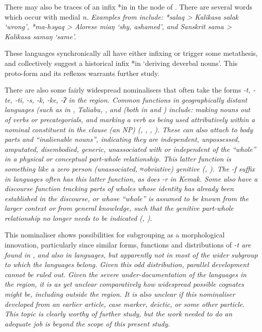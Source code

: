 There may also be traces of an infix *\<in\> in the
 node of .
There are several words which
occur with medial \it{n}.
Examples from \citet{Fricke2019} include:
*salaq > Kalikasa \it{salak} `wrong',
*ma-həyaq > Alorese \it{miaŋ} `shy, ashamed',
and Sanskrit \it{sama} > Kalikasa \it{samaŋ} `same'.

These languages synchronically all have either infixing or trigger
some metathesis, and collectively suggest a historical infix *\<in\> ‘deriving deverbal nouns’.
This proto-form and its reflexes warrants further study.

There are also some fairly widespread nominalisers that often
take the forms \it{-t, -te, -ti, -s, -k, -ke, -ʔ} in the region.
Common functions in geographically distant languages (such as
in , Taliabu, , and   (both in 
and ) include: making nouns out of verbs
or precategorials, and marking a verb as being used attributively within a nominal
constituent in the clause (an NP)
(\citealp{Jonker1906}, \citealp[30--33]{Collins1983}, \citealp[101--104, 143--145, 180--182]{Grimes1991c}, \citealp{Tamelan2021}).
These can also attach to body parts
and “inalienable nouns”, indicating they are independent,
unpossessed, amputated, disembodied, generic,
unassociated with or independent of the “whole” in a physical
or conceptual part-whole relationship.
This latter function is something like a zero person (unassociated, ≈obviative)
genitive (\citealp[442]{Edwards2020}, \citealp{Tamelan2021}).
The \it{-f} suffix in  languages often has this latter
function, as does \it{-r} in Kemak.
Some also have a discourse function tracking parts of wholes
whose identity has already been established in the discourse,
or whose “whole” is assumed to be known from the larger context
or from general knowledge,
such that the genitive part-whole relationship no longer needs
to be indicated (\citealp[288f]{Grimes1991c}, \citealp[617f]{Grimes2024}).

This nominaliser shows possibilities for subgrouping as a morphological
innovation, particularly since similar forms,
functions and distributions of \it{-t} are found in ,
 and also in  languages,
but apparently not in most of the wider  subgroup
to which the  languages belong.
Given this odd distribution,
parallel development cannot be ruled out.
Given the severe under-documentation of the languages in the
region, it is as yet unclear comparatively how widespread possible cognates
might be, including outside the region.
It is also unclear if this nominaliser developed from an earlier
article, case marker, deictic, or some other particle.
This topic is clearly worthy of further study,
but the work needed to do an adequate job is beyond the scope
of this present study.

